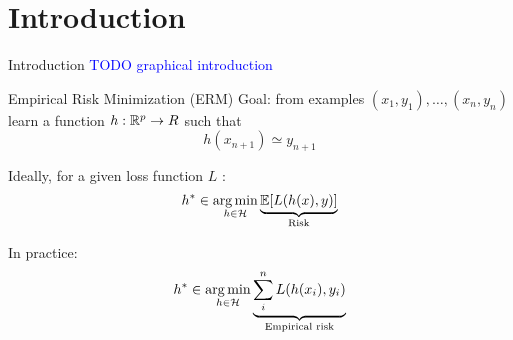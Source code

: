 

\section{Introduction}
\label{sec:intro}

\begin{frame}{Introduction}
\textcolor{blue}{TODO graphical introduction}
\end{frame}

\begin{frame}{Empirical Risk Minimization (ERM)}
    \alert{Goal}: from examples $(x_1, y_1), \dots, (x_n, y_n)$ learn a function $h: \mathbb{R}^p \rightarrow R$ such that 
    \begin{equation*}
        h(x_{n+1}) \simeq y_{n+1}
    \end{equation*}

\pause

\alert{Ideally}, for a given loss function $L$ :
\begin{equation*}
    h^* \in \mathop{\mathrm{arg\,min}}_{h \in \mathcal{H}} \underbrace{\mathbb{E} [L(h(x), y)]}_{\text{Risk}}
\end{equation*}

\pause 

\alert{In practice}:
\begin{equation*}
    h^* 
    \in 
    \mathop{\mathrm{arg\,min}}_{h \in \mathcal{H}} 
    \underbrace{\sum_i^n L(h(x_i), y_i)}_{\text{Empirical risk}}
\end{equation*}

\end{frame}

